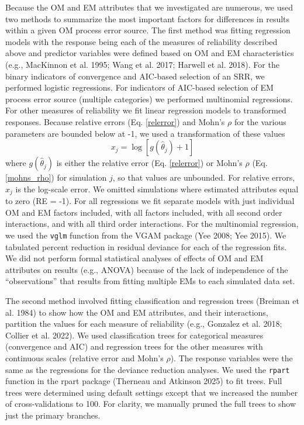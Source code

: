 \documentclass[
  12pt,
]{article}
\begin{document}
Because the OM and EM attributes that we investigated are numerous, we
used two methods to summarize the most important factors for differences
in results within a given OM process error source. The first method was
fitting regression models with the response being each of the measures
of reliability described above and predictor variables were defined
based on OM and EM characteristics (e.g., MacKinnon et al. 1995; Wang et
al. 2017; Harwell et al. 2018). For the binary indicators of convergence
and AIC-based selection of an SRR, we performed logistic regressions.
For indicators of AIC-based selection of EM process error source
(multiple categories) we performed multinomial regressions. For other
measures of reliability we fit linear regression models to transformed
responses. Because relative errors (Eq. \ref{relerror}) and Mohn's
\(\rho\) for the various parameters are bounded below at -1, we used a
transformation of these values
\begin{equation}\label{bias_regression_response}
x_j = \log\left[g\left(\widehat \theta_j\right)+1\right]
\end{equation} where \(g\left(\widehat \theta_j\right)\) is either the
relative error (Eq. \ref{relerror}) or Mohn's \(\rho\) (Eq.
\ref{mohns_rho}) for simulation \(j\), so that values are unbounded. For
relative errors, \(x_j\) is the log-scale error. We omitted simulations
where estimated attributes equal to zero (RE = -1). For all regressions
we fit separate models with just individual OM and EM factors included,
with all factors included, with all second order interactions, and with
all third order interactions. For the multinomial regression, we used
the \verb|vglm| function from the VGAM package (Yee 2008; Yee 2015). We
tabulated percent reduction in residual deviance for each of the
regression fits. We did not perform formal statistical analyses of
effects of OM and EM attributes on results (e.g., ANOVA) because of the
lack of independence of the ``observations'' that results from fitting
multiple EMs to each simulated data set.

The second method involved fitting classification and regression trees
(Breiman et al. 1984) to show how the OM and EM attributes, and their
interactions, partition the values for each measure of reliability
(e.g., Gonzalez et al. 2018; Collier et al. 2022). We used
classification trees for categorical measures (convergence and AIC) and
regression trees for the other measures with continuous scales (relative
error and Mohn's \(\rho\)). The response variables were the same as the
regressions for the deviance reduction analyses. We used the
\verb|rpart| function in the rpart package (Therneau and Atkinson 2025)
to fit trees. Full trees were determined using default settings except
that we increased the number of cross-validations to 100. For clarity,
we manually pruned the full trees to show just the primary branches.
\end{document}
